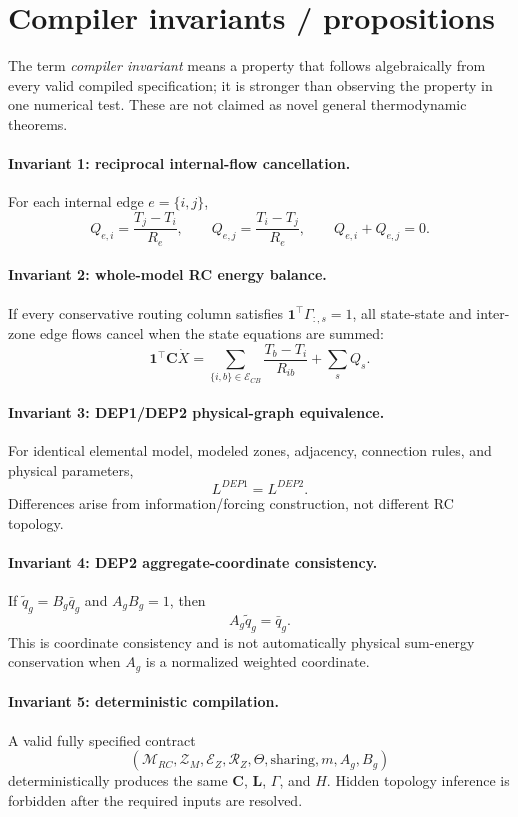 \documentclass[11pt]{article}
\newcommand{\ones}{\mathbf{1}}
\begin{document}
\section{Compiler invariants / propositions}
The term \emph{compiler invariant} means a property that follows algebraically from every valid compiled specification; it is stronger than observing the property in one numerical test.  These are not claimed as novel general thermodynamic theorems.

\paragraph{Invariant 1: reciprocal internal-flow cancellation.}
For each internal edge $e=\{i,j\}$,
\[
Q_{e,i}=\frac{T_j-T_i}{R_e},\qquad Q_{e,j}=\frac{T_i-T_j}{R_e},\qquad Q_{e,i}+Q_{e,j}=0.
\]

\paragraph{Invariant 2: whole-model RC energy balance.}
If every conservative routing column satisfies $\ones^\top\Gamma_{:,s}=1$, all state-state and inter-zone edge flows cancel when the state equations are summed:
\[
\boxed{
\ones^\top\mathbf C\dot X
=
\sum_{\{i,b\}\in\mathcal E_{CB}}\frac{T_b-T_i}{R_{ib}}
+\sum_s Q_s.
}
\]

\paragraph{Invariant 3: DEP1/DEP2 physical-graph equivalence.}
For identical elemental model, modeled zones, adjacency, connection rules, and physical parameters,
\[
\boxed{L^{DEP1}=L^{DEP2}.}
\]
Differences arise from information/forcing construction, not different RC topology.

\paragraph{Invariant 4: DEP2 aggregate-coordinate consistency.}
If $\tilde q_g=B_g\bar q_g$ and $A_gB_g=1$, then
\[
\boxed{A_g\tilde q_g=\bar q_g.}
\]
This is coordinate consistency and is not automatically physical sum-energy conservation when $A_g$ is a normalized weighted coordinate.

\paragraph{Invariant 5: deterministic compilation.}
A valid fully specified contract
\[
(\mathcal M_{RC},\mathcal Z_M,\mathcal E_Z,\mathcal R_Z,\Theta,\text{sharing},m,A_g,B_g)
\]
deterministically produces the same $\mathbf C$, $\mathbf L$, $\Gamma$, and $H$. Hidden topology inference is forbidden after the required inputs are resolved.
\end{document}

